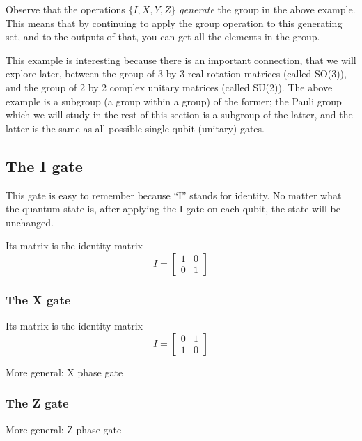 \documentclass{article}
\theoremstyle{definition}
\begin{document}
Observe that the operations $\{I,X,Y,Z\}$ \textit{generate} the group in the above example.  This means that by continuing to apply the group operation to this generating set, and to the outputs of that, you can get all the elements in the group.

This example is interesting because there is an important connection, that we will explore later, between the group of 3 by 3 real rotation matrices (called SO(3)), and the group of 2 by 2 complex unitary matrices (called SU(2)).  The above example is a subgroup (a group within a group) of the former; the Pauli group which we will study in the rest of this section is a subgroup of the latter, and the latter is the same as all possible single-qubit (unitary) gates.

\subsection{The I gate}
This gate is easy to remember because ``I'' stands for identity.  No matter what the quantum state is, after applying the I gate on each qubit, the state will be unchanged.

Its matrix is the identity matrix
\begin{equation}
	I = \begin{bmatrix}
		1 & 0\\
		0 & 1
	\end{bmatrix}
\end{equation}

\subsubsection{The X gate}
Its matrix is the identity matrix
\begin{equation}
	I = \begin{bmatrix}
		0 & 1\\
		1 & 0
	\end{bmatrix}
\end{equation}

\begin{figure}[H]
\end{figure}
\begin{figure}[H]
\end{figure}
More general: X phase gate

\newpage
\subsubsection{The Z gate}
\begin{figure}[H]
\end{figure}
\begin{figure}[H]
\end{figure}
More general: Z phase gate
\end{document}
